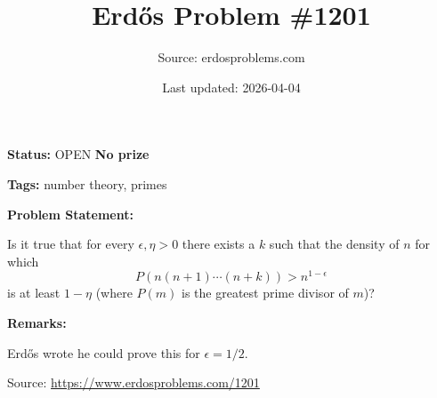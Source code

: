 \documentclass{article}
\title{Erd\H{o}s Problem \#1201}
\date{Last updated: 2026-04-04}
\author{Source: erdosproblems.com}
\begin{document}
\maketitle

\noindent\textbf{Status:} OPEN \quad \textbf{No prize}

\noindent\textbf{Tags:} number theory, primes

\medskip
\noindent\textbf{Problem Statement:}

Is it true that for every $\epsilon,\eta>0$ there exists a $k$ such that the density of $n$ for which\[P(n(n+1)\cdots(n+k))>n^{1-\epsilon}\]is at least $1-\eta$ (where $P(m)$ is the greatest prime divisor of $m$)?

\bigskip
\noindent\textbf{Remarks:}

Erd\H{o}s wrote he could prove this for $\epsilon=1/2$.

\bigskip
\noindent\small{Source: \url{https://www.erdosproblems.com/1201}}
\end{document}
